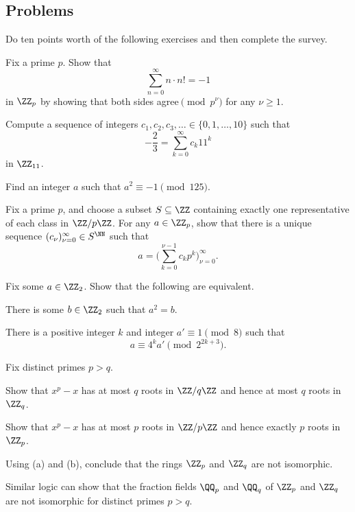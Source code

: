 \documentclass[../notes.tex]{subfiles}
\begin{document}
\subsection{Problems}
Do ten points worth of the following exercises and then complete the survey.
\begin{prob}[2 points]
	Fix a prime $p$. Show that
	\[\sum_{n=0}^\infty n\cdot n!=-1\]
	in $\ZZ_p$ by showing that both sides agree$\pmod{p^\nu}$ for any $\nu\ge1$.
\end{prob}
\begin{prob}[2 points]
	Compute a sequence of integers $c_1,c_2,c_3,\ldots\in\{0,1,\ldots,10\}$ such that
	\[-\frac23=\sum_{k=0}^\infty c_k11^k\]
	in $\ZZ_{11}$.
\end{prob}
\begin{prob}[3 points]
	Find an integer $a$ such that $a^2\equiv-1\pmod{125}$.
\end{prob}
\begin{prob}[3 points]
	Fix a prime $p$, and choose a subset $S\subseteq\ZZ$ containing exactly one representative of each class in $\ZZ/p\ZZ$. For any $a\in\ZZ_p$, show that there is a unique sequence $(c_\nu)_{\nu=0}^\infty\in S^\NN$ such that
	\[a=\Bigg(\sum_{k=0}^{\nu-1}c_kp^k\Bigg)_{\nu=0}^\infty.\]
\end{prob}
\begin{prob}[3 points]
	Fix some $a\in\ZZ_2$. Show that the following are equivalent.
	\begin{listalph}
		\item There is some $b\in\ZZ_2$ such that $a^2=b$.
		\item There is a positive integer $k$ and integer $a'\equiv1\pmod8$ such that
		\[a\equiv 4^ka'\pmod{2^{2k+3}}.\]
	\end{listalph}
\end{prob}
\begin{prob}[4 points]
	Fix distinct primes $p>q$.
	\begin{listalph}
		\item Show that $x^p-x$ has at most $q$ roots in $\ZZ/q\ZZ$ and hence at most $q$ roots in $\ZZ_q$.
		\item Show that $x^p-x$ has at most $p$ roots in $\ZZ/p\ZZ$ and hence exactly $p$ roots in $\ZZ_p$.
		\item Using (a) and (b), conclude that the rings $\ZZ_p$ and $\ZZ_q$ are not isomorphic.
	\end{listalph}
	Similar logic can show that the fraction fields $\QQ_p$ and $\QQ_q$ of $\ZZ_p$ and $\ZZ_q$ are not isomorphic for distinct primes $p>q$.
\end{prob}
\end{document}
